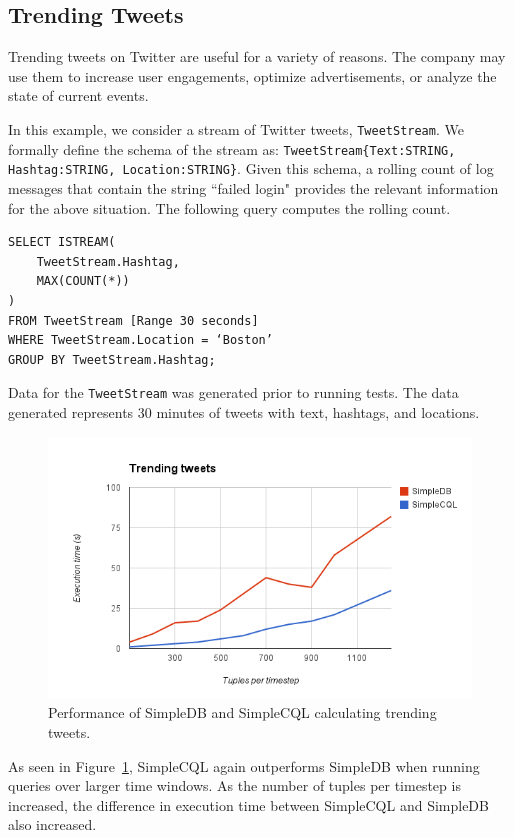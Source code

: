 \documentclass[a4paper, 10pt, conference]{IEEEconf}
\begin{document}
\subsection{Trending Tweets}
Trending tweets on Twitter are useful for a variety of reasons.  The company may use them to increase user engagements, optimize advertisements, or analyze the state of current events.  

In this example, we consider a stream of Twitter tweets, \texttt{TweetStream}. We formally define the schema of the stream as: \texttt{TweetStream\{Text:STRING, Hashtag:STRING, Location:STRING\}}.  Given this schema, a rolling count of log messages that contain the string ``failed login" provides the relevant information for the above situation.  The following query computes the rolling count.

\begin{verbatim}
SELECT ISTREAM(
    TweetStream.Hashtag,
    MAX(COUNT(*))
)
FROM TweetStream [Range 30 seconds]
WHERE TweetStream.Location = ‘Boston’
GROUP BY TweetStream.Hashtag;
\end{verbatim}

Data for the \texttt{TweetStream} was generated prior to running tests.  The data generated represents 30 minutes of tweets with text, hashtags, and locations.   

\begin{figure}[tpH!]
    \centering
    \centerline{\includegraphics[totalheight=5cm]{trending.png}}
    \caption{Performance of SimpleDB and SimpleCQL calculating trending tweets.}
    \label{fig:trending}
\end{figure}

As seen in Figure~\ref{fig:trending}, SimpleCQL again outperforms SimpleDB when running queries over larger time windows.  As the number of tuples per timestep is increased, the difference in execution time between SimpleCQL and SimpleDB also increased.
\end{document}
